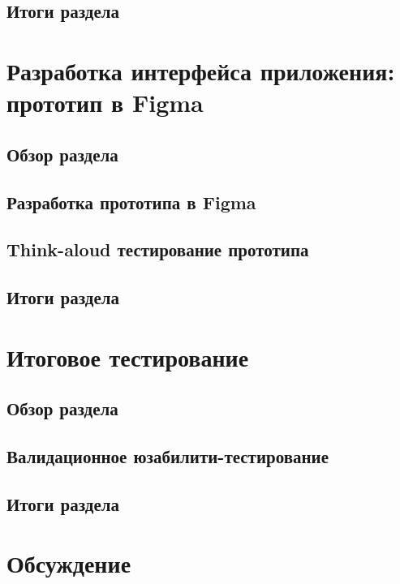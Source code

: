 \documentclass[pdflatex,sn-mathphys-num]{sn-jnl}%
\theoremstyle{thmstyleone}%
\theoremstyle{thmstyletwo}%
\theoremstyle{thmstylethree}%
\begin{document}
\subsection{Итоги раздела}

\section{Разработка интерфейса приложения: прототип в Figma}

\subsection{Обзор раздела}

\subsection{Разработка прототипа в Figma}

\subsection{Think-aloud тестирование прототипа}

\subsection{Итоги раздела}

\section{Итоговое тестирование}

\subsection{Обзор раздела}

\subsection{Валидационное юзабилити-тестирование}

\subsection{Итоги раздела}

\section{Обсуждение}\label{Discussion}
\end{document}
